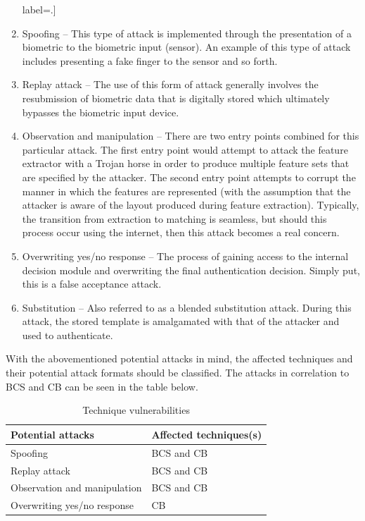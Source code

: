     \begin{enumerate}[]label=\roman*.]
    
        \item Spoofing – This type of attack is implemented through the presentation of a   biometric to the biometric input (sensor). An example of this type of attack includes presenting a fake finger to the sensor and so forth.
        \item Replay attack – The use of this form of attack generally involves the resubmission of biometric data that is digitally stored which ultimately bypasses the biometric input device.
        \item Observation and manipulation – There are two entry points combined for this particular attack. The first entry point would attempt to attack the feature extractor with a Trojan horse in order to produce multiple feature sets that are specified by the attacker. The second entry point attempts to corrupt the manner in which the features are represented (with the assumption that the attacker is aware of the layout produced during feature extraction). Typically, the transition from extraction to matching is seamless, but should this process occur using the internet, then this attack becomes a real concern.
        \item Overwriting yes/no response – The process of gaining access to the internal decision module and overwriting the final authentication decision. Simply put, this is a false acceptance attack.
        \item Substitution – Also referred to as a blended substitution attack. During this attack, the stored template is amalgamated with that of the attacker and used to authenticate.

    \end{enumerate}
    
    With the abovementioned potential attacks in mind, the affected techniques and their potential attack formats should be classified. The attacks in correlation to BCS and CB can be seen in the table below.
    
    
    \begin{table}[h!]
    \caption{Technique vulnerabilities}
    \centering
     \begin{tabular}{|p{} | p{}|} 
     \hline
    	\textbf{Potential attacks} & \textbf{Affected techniques(s)} \\ [1ex] 
     \hline\hline 
     Spoofing & BCS and CB  \\[1ex]
     \hline 
     Replay attack & BCS and CB \\[1ex]
     \hline
     Observation and manipulation & BCS and CB\\[1ex]
     \hline           
     Overwriting yes/no response & CB\\[1ex]
     \hline
     \end{tabular}
    \end{table}
    
